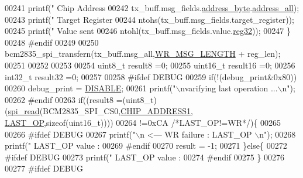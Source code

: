\begin{DoxyCode}
{{{{00241        printf(\textcolor{stringliteral}{"       Chip Address %
00242        tx\_buff.msg\_fields.\hyperlink{a00020_af6a65bac733ea3e9b1d24b065163d49a}{address\_byte}.\hyperlink{a00011_a7bf6defa0ae3fb2bca057a3a97d4f740}{address\_all});
00243        printf(\textcolor{stringliteral}{"       Target Register %
00244        ntohs(tx\_buff.msg\_fields.target\_register));
00245        printf(\textcolor{stringliteral}{"       Value sent  %
00246        ntohl(tx\_buff.msg\_fields.value.\hyperlink{a00020_a83e2be8d3feb1bcbc286bfaae10ac552}{reg32}));
00247        \}
00248 \textcolor{preprocessor}{    #endif}
00249 \textcolor{preprocessor}{}
00250     bcm2835\_spi\_transfern(tx\_buff.msg\_all,\hyperlink{a00041_ac85ecf34a5cbd85d6dbd51b4c9a5469e}{WR\_MSG\_LENGTH} + reg\_len);
00251     
00252 
00253     
00254     uint8\_t  result8  =0;
00255     uint16\_t result16 =0;
00256     int32\_t result32 =0;    
00257     
00258 \textcolor{preprocessor}{     #ifdef DEBUG }
00259 \textcolor{preprocessor}{}     \textcolor{keywordflow}{if}(!(debug\_print&0x80))
00260      debug\_print = \hyperlink{a00037_a99496f7308834e8b220f7894efa0b6ab}{DISABLE};
00261        printf(\textcolor{stringliteral}{"\(\backslash\)nvarifying last operation  ...\(\backslash\)n"});
00262 \textcolor{preprocessor}{     #endif}
00263 \textcolor{preprocessor}{}     \textcolor{keywordflow}{if}((result8 =(uint8\_t)(\hyperlink{a00007_ga7ad9f65ee46aca507374096506a0b1c4}{spi\_read}(BCM2835\_SPI\_CS0,\hyperlink{a00037_a94de2b046db6e10257ef4481c0a15eaa}{CHIP\_ADDRESS1},
      \hyperlink{a00036_aed1301248abf6c26045727a190f6550a}{LAST\_OP},\textcolor{keyword}{sizeof}(uint16\_t))))
00264      !=0xCA \textcolor{comment}{/*LAST\_OP!=WR*/})\{
00265              
00266 \textcolor{preprocessor}{     #ifdef DEBUG}
00267 \textcolor{preprocessor}{}       printf(\textcolor{stringliteral}{"\(\backslash\)n                                               <---  WR failure : LAST\_OP \(\backslash\)n"});
00268        printf(\textcolor{stringliteral}{"        LAST\_OP value  :%
00269 \textcolor{preprocessor}{     #endif}
00270 \textcolor{preprocessor}{}     result = -1;
00271      \}\textcolor{keywordflow}{else}\{
00272 \textcolor{preprocessor}{      #ifdef DEBUG}
00273 \textcolor{preprocessor}{}       printf(\textcolor{stringliteral}{"        LAST\_OP value  :%
00274 \textcolor{preprocessor}{     #endif}
00275 \textcolor{preprocessor}{}     \}
00276      
00277 \textcolor{preprocessor}{     #ifdef DEBUG}
}}}}}}}}}
\end{DoxyCode}

